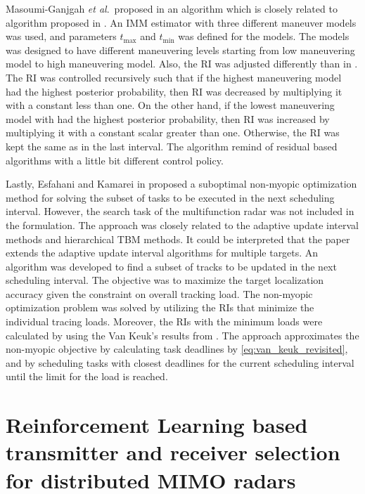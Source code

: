 \documentclass[english, 12pt, a4paper, elec, utf8, a-1b, online]{aaltothesis}
\newcommand{\etal}{\textit{et al}.~}
\newcommand{\tmax}{t_\text{max}}
\newcommand{\tmin}{t_\text{min}}
\begin{document}
Masoumi-Ganjgah \etal proposed in \cite{MasoumiGanjgah2017} an algorithm which is closely related to algorithm proposed in \cite{Benoudnine2006}.
An IMM estimator with three different maneuver models was used, and parameters $\tmax$ and $\tmin$ was defined for the models.
The models was designed to have different maneuvering levels starting from low maneuvering model to high maneuvering model.
Also, the RI was adjusted differently than in \cite{Benoudnine2006}.
The RI was controlled recursively such that if the highest maneuvering model had the highest posterior probability, then 
RI was decreased by multiplying it with a constant less than one.
On the other hand, if the lowest maneuvering model with had the highest posterior probability, then
RI was increased by multiplying it with a constant scalar greater than one.
Otherwise, the RI was kept the same as in the last interval.
The algorithm remind of residual based algorithms with a little bit different control policy.

Lastly, Esfahani and Kamarei in \cite{Esfahani2012} proposed a suboptimal non-myopic optimization method for solving the subset of tasks to be executed in the next scheduling interval.
However, the search task of the multifunction radar was not included in the formulation.
The approach was closely related to the adaptive update interval methods and hierarchical TBM methods.
It could be interpreted that the paper extends the adaptive update interval algorithms for multiple targets.
An algorithm was developed to find a subset of tracks to be updated in the next scheduling interval.
The objective was to maximize the target localization accuracy given the constraint on overall tracking load.
The non-myopic optimization problem was solved by utilizing the RIs that minimize the individual tracing loads.
Moreover, the RIs with the minimum loads were calculated by using the Van Keuk's results from \cite{vanKeuk1993}.
The approach approximates the non-myopic objective by calculating task deadlines by \eqref{eq:van_keuk_revisited}, and by scheduling tasks with closest deadlines for the current scheduling interval until the limit for the load is reached.

\newpage
\section{Reinforcement Learning based transmitter and receiver selection for distributed MIMO radars}\label{sec:RL_TX_RX}
\end{document}
